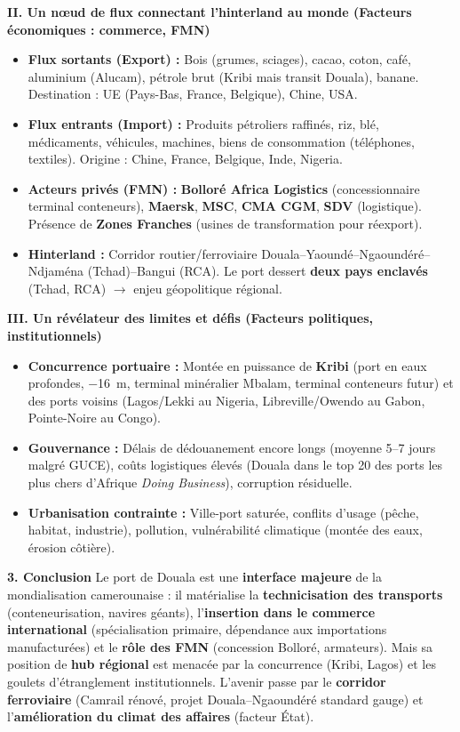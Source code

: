 \documentclass[11pt]{article}
\begin{document}
\begin{exoresolu}
\textbf{II. Un nœud de flux connectant l'hinterland au monde (Facteurs économiques : commerce, FMN)}
\begin{itemize}
    \item \textbf{Flux sortants (Export) :} Bois (grumes, sciages), cacao, coton, café, aluminium (Alucam), pétrole brut (Kribi mais transit Douala), banane. Destination : UE (Pays-Bas, France, Belgique), Chine, USA.
    \item \textbf{Flux entrants (Import) :} Produits pétroliers raffinés, riz, blé, médicaments, véhicules, machines, biens de consommation (téléphones, textiles). Origine : Chine, France, Belgique, Inde, Nigeria.
    \item \textbf{Acteurs privés (FMN) :} \textbf{Bolloré Africa Logistics} (concessionnaire terminal conteneurs), \textbf{Maersk}, \textbf{MSC}, \textbf{CMA CGM}, \textbf{SDV} (logistique). Présence de \textbf{Zones Franches} (usines de transformation pour réexport).
    \item \textbf{Hinterland :} Corridor routier/ferroviaire Douala–Yaoundé–Ngaoundéré–Ndjaména (Tchad)–Bangui (RCA). Le port dessert \textbf{deux pays enclavés} (Tchad, RCA) $\rightarrow$ enjeu géopolitique régional.
\end{itemize}

\textbf{III. Un révélateur des limites et défis (Facteurs politiques, institutionnels)}
\begin{itemize}
    \item \textbf{Concurrence portuaire :} Montée en puissance de \textbf{Kribi} (port en eaux profondes, \SI{-16}{m}, terminal minéralier Mbalam, terminal conteneurs futur) et des ports voisins (Lagos/Lekki au Nigeria, Libreville/Owendo au Gabon, Pointe-Noire au Congo).
    \item \textbf{Gouvernance :} Délais de dédouanement encore longs (moyenne \num{5}–\num{7} jours malgré GUCE), coûts logistiques élevés (Douala dans le top 20 des ports les plus chers d'Afrique \emph{Doing Business}), corruption résiduelle.
    \item \textbf{Urbanisation contrainte :} Ville-port saturée, conflits d'usage (pêche, habitat, industrie), pollution, vulnérabilité climatique (montée des eaux, érosion côtière).
\end{itemize}

\textbf{3. Conclusion}
Le port de Douala est une \textbf{interface majeure} de la mondialisation camerounaise : il matérialise la \textbf{technicisation des transports} (conteneurisation, navires géants), l'\textbf{insertion dans le commerce international} (spécialisation primaire, dépendance aux importations manufacturées) et le \textbf{rôle des FMN} (concession Bolloré, armateurs). Mais sa position de \textbf{hub régional} est menacée par la concurrence (Kribi, Lagos) et les goulets d'étranglement institutionnels. L'avenir passe par le \textbf{corridor ferroviaire} (Camrail rénové, projet Douala–Ngaoundéré standard gauge) et l'\textbf{amélioration du climat des affaires} (facteur État).
\end{exoresolu}
\end{document}
